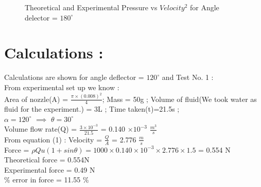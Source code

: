 \documentclass[12pt,a4paper]{article}
\begin{document}
\begin{figure}[!ht]
	\begin{center}
	\end{center}
	\caption{Theoretical and Experimental Pressure vs $Velocity^{2}$ for Angle delector = $180 ^{\circ}$}
\end{figure}



\newpage

\section{Calculations :}
Calculations are shown for angle deflector = $120^{\circ}$ and Test No. 1 :\\
From experimental set up we know : \\
Area of nozzle(A) = $\frac{\pi \times (0.008)^{2}}{4}$;
Mass = 50g ; Volume of fluid(We took water as fluid for the experiment.) = 3L ; Time taken(t)=21.5s ;\\ $\alpha = 120 ^{\circ}$ $\implies $ $\theta = 30^{\circ}$ \\
Volume flow rate(Q) = $\frac{3 \times 10^{-3}}{21.5}$ = 0.140 $\times 10^{-3}$ $\frac{m^{3}}{s}$\\
From equation (1) : Velocity = $\frac{Q}{A}$ = 2.776 $\frac{m}{s}$\\
Force = $\rho Q u(1 + sin\theta) = 1000 \times 0.140 \times 10 ^{-3} \times 2.776 \times 1.5 $
      = 0.554 N
Theoretical force = 0.554N \\
Experimental force = 0.49 N \\
$\%$ error in force = 11.55 $\%$ \\
\end{document}
